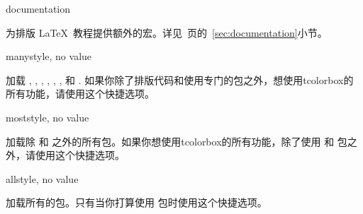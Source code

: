 {\begin{docTcbKey}[library]{documentation}{}{}

  为排版 \LaTeX\ 教程提供额外的宏。详见~\pageref{sec:documentation}页的~\ref{sec:documentation}小节。
\end{docTcbKey}

\begin{docTcbKey}[library]{many}{}{style, no value}

加载 , , , ,%
, , 和 .%
如果你除了排版代码和使用专门的包之外，想使用tcolorbox的所有功能，请使用这个快捷选项。
\end{docTcbKey}

\begin{docTcbKey}[library]{most}{}{style, no value}

  加载除  和  之外的所有包。如果你想使用tcolorbox的所有功能，除了使用  和  包之外，请使用这个快捷选项。
\end{docTcbKey}


\begin{docTcbKey}[library]{all}{}{style, no value}

  加载所有的包。只有当你打算使用  包时使用这个快捷选项。
\end{docTcbKey}

}
